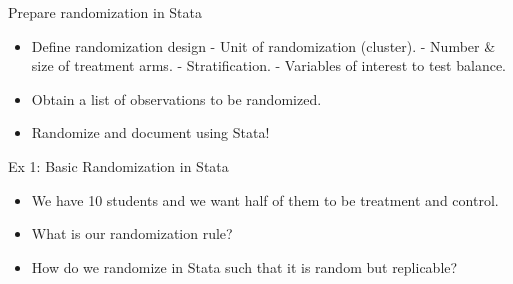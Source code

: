 \documentclass[aspectratio=169]{beamer}
\begin{document}
\begin{frame}{Prepare randomization in Stata}

\begin{itemize}[<default overlay specification>]
	\item<1> Define randomization design
		\newline - Unit of randomization (cluster).
		\newline - Number \& size of treatment arms. 
		\newline - Stratification.
		\newline - Variables of interest to test balance.
	\item<1> Obtain a list of observations to be randomized.
	\item<1> Randomize and document using Stata!
\end{itemize}

\end{frame}


\begin{frame}{Ex 1: Basic Randomization in Stata}

\begin{itemize}[<default overlay specification>]
	\item<1> We have 10 students and we want half of them to be treatment and control.
	\item<1> What is our randomization rule?
	\item<1> How do we randomize in Stata such that it is random but replicable?
\end{itemize}

\end{frame}
\end{document}
